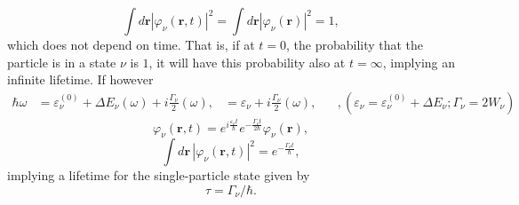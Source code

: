 \begin{equation}
\int d\mathbf r|\varphi_{\nu}(\mathbf r,t)|^2 = \int d\mathbf r  |\varphi_{\nu}(\mathbf r)|^2 = 1 ,
\label{eqn:44}
\end{equation}
which does not depend on time. That is, if at $t=0$, the probability that the particle is in a state $\nu$ is $1$, it will have this probability also at $t=\infty$, implying an infinite lifetime. If however
\begin{eqnarray}
\nonumber
\hbar\omega &= \varepsilon_{\nu}^{(0)} + \Delta E_{\nu}(\omega) + i \frac{\Gamma_\nu}{2} (\omega),
\nonumber
&= \varepsilon_{\nu} + i \frac{\Gamma_{\nu}}{2}(\omega), \;\;\;\;\;\; , (\varepsilon_{\nu} = \varepsilon_{\nu}^{(0)} + \Delta E_{\nu};\Gamma_\nu=2W_\nu)
\end{eqnarray}
\begin{equation}
\nonumber
\varphi_{\nu}(\mathbf r, t) = e^{i \frac{\varepsilon_{\nu} t}{\hbar}} e^{- \frac{\Gamma_{\nu} t}{2\hbar}} \varphi_{\nu}(\mathbf r),
\end{equation}
\begin{equation}
\int d\mathbf r\, |\varphi_{\nu} (\mathbf r, t)|^2 = e^{- \frac{\Gamma_{\nu} t}{\hbar}} ,
\label{eqn:44b}
\end{equation}
implying a lifetime for the single-particle state given by
\begin{equation}
\tau = \Gamma_\nu/\hbar .
\label{eqn:45}
\end{equation}

